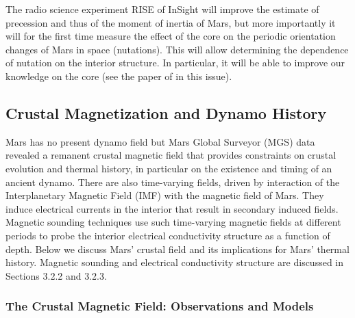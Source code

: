 The radio science experiment RISE of InSight will improve the estimate of precession and thus of the moment of inertia of Mars, but more importantly it will for the first time measure the effect of the core on the periodic orientation changes of Mars in space (nutations). This will allow determining  the dependence of nutation on the interior structure. In particular, it will be able to improve our knowledge on the core (see the paper of \cite{Folkner2018} in this issue).


\subsection{Crustal Magnetization and Dynamo History}
Mars has no present dynamo field but Mars Global Surveyor (MGS) data revealed a remanent crustal magnetic field that provides constraints on crustal evolution and thermal history, in particular on the existence and timing of an ancient dynamo.  There are also time-varying fields, driven by interaction of the Interplanetary Magnetic Field (IMF) with the magnetic field of Mars. They induce electrical currents in the interior that result in secondary induced fields. Magnetic sounding techniques use such time-varying magnetic fields at different periods to probe the interior electrical conductivity structure as a function of depth.  Below we discuss Mars' crustal field and its implications for Mars' thermal history. Magnetic sounding and electrical conductivity structure are discussed in Sections 3.2.2 and 3.2.3.

\subsubsection{The Crustal Magnetic Field: Observations and Models}

